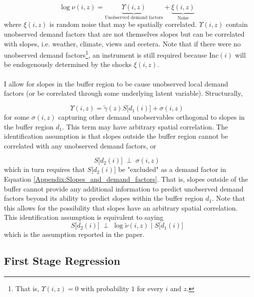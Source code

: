 \documentclass[12pt]{article}
\begin{document}
	\begin{equation*}
		\log \nu(i, z) = \underbrace{\Upsilon(i,z)}_{\text{Unobserved demand factors}} +  \underbrace{\xi(i, z)}_{\text{Noise}}
	\end{equation*}
	where $\xi(i, z)$ is random noise that may be spatially correlated. $\Upsilon(i, z)$ contain unobserved demand factors that are not themselves slopes but can be correlated with slopes, i.e. weather, climate, views and ecetera. Note that if there were no unobserved demand factors\footnote{That is, $\Upsilon(i, z) = 0$ with probability $1$ for every $i$ and $z$.}, an instrument is still required because $\text{Inc}(i)$ will be endogenously determined by the shocks $\xi(i, z)$.  
	
	\paragraph*{}
	I allow for slopes in the buffer region to be cause unobserved local demand factors (or be correlated through some underlying latent variable). Structurally,
	
	\begin{equation}\label{Appendix:Slopes_and_demand_factors}
		\Upsilon(i,z) = \tilde{\gamma}(z)S\big[d_{1}(i)\big] + \sigma(i, z)
	\end{equation}
	for some $\sigma(i, z)$ capturing other demand unobservables orthogonal to slopes in the buffer region $d_{1}$. This term may have arbitrary spatial correlation. The identification assumption is that slopes outside the buffer region cannot be correlated with any unobserved demand factors, or
	
	\begin{equation}
		S\big[d_{2}(i)\big] \; \perp \; \sigma(i, z)
	\end{equation}
	which in turn requires that $S\big[d_{2}(i)\big]$ be "excluded" as a demand factor in Equation \eqref{Appendix:Slopes_and_demand_factors}. That is, slopes outside of the buffer cannot provide any additional information to predict unobserved demand factors beyond its ability to predict slopes within the buffer region $d_{1}$. Note that this allows for the possibility that slopes have an arbitrary spatial correlation. This identification assumption is equivalent to saying $$S\big[d_{2}(i)\big] \; \perp \; \log \tilde{\nu}(i, z) \; |  \; S\big[d_{1}(i)\big]$$
	which is the assumption reported in the paper.
	
	\clearpage
	
	\subsection{First Stage Regression}\label{Appendix:FirstStage}
	
\end{document}
